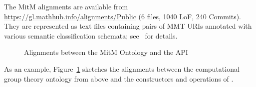 The MitM alignments are available from \url{https://gl.mathhub.info/alignments/Public} (6
files, 1040 LoF, 240 Commits). They are represented as text files containing pairs of MMT
URIs annotated with various semantic classification schemata;
see~\cite{MueGauKal:cacfms17} for details.
\begin{figure}[ht]\centering
  \caption{Alignments between the MitM Ontology and the \GAP API}\label{fig:cgtontology}
\end{figure}

As an example, Figure~\ref{fig:cgtontology} sketches the alignments between the
computational group theory ontology from above and the constructors and operations of
\GAP.


